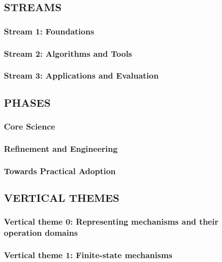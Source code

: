 \subsection{STREAMS}
\subsubsection{Stream 1: Foundations}
\subsubsection{Stream 2: Algorithms and Tools}
\subsubsection{Stream 3: Applications and Evaluation}

\subsection{PHASES}
\subsubsection{Core Science}
\subsubsection{Refinement and Engineering}
\subsubsection{Towards Practical Adoption}


\subsection{VERTICAL THEMES}
\subsubsection{Vertical theme 0: Representing mechanisms and their operation domains}
\subsubsection{Vertical theme 1: Finite-state mechanisms}
